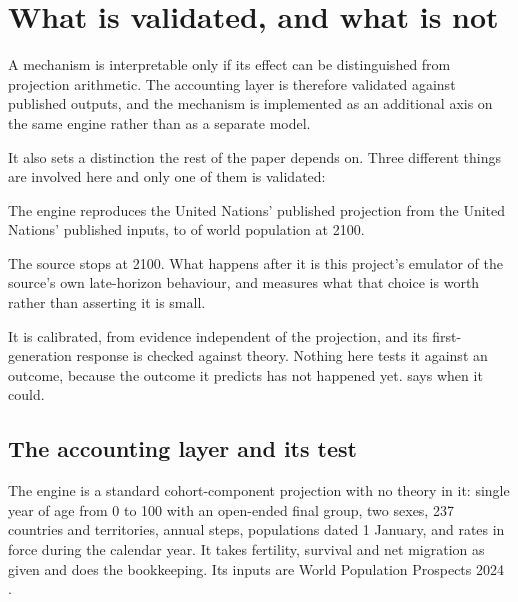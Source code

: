 \section{What is validated, and what is not}
\label{sec:engine}

A mechanism is interpretable only if its effect can be distinguished from
projection arithmetic. The accounting layer is therefore validated against
published outputs, and the mechanism is implemented as an additional axis on the
same engine rather than as a separate model.

It also sets a distinction the rest of the paper depends on. Three different
things are involved here and only one of them is validated:

\begin{description}[leftmargin=1.4em,style=nextline]
  \item[The accounting is validated.] The engine reproduces the United Nations'
  published projection from the United Nations' published inputs, to
  \ValidationWorld{} of world population at 2100.
  \item[The post-2100 continuation is ours.] The source stops at 2100. What
  happens after it is this project's emulator of the source's own late-horizon
  behaviour, and  measures what that choice is worth rather
  than asserting it is small.
  \item[The mechanism is not validated at all.] It is calibrated, from evidence
  independent of the projection, and its first-generation response is checked
  against theory. Nothing here tests it against an outcome, because the outcome
  it predicts has not happened yet.  says when it could.
\end{description}

\subsection{The accounting layer and its test}

The engine is a standard cohort-component projection with no theory in it:
single year of age from 0 to 100 with an open-ended final group, two sexes, 237
countries and territories, annual steps, populations dated 1 January, and rates
in force during the calendar year. It takes fertility, survival and net migration
as given and does the bookkeeping. Its inputs are World Population Prospects 2024
\citep{un2024methodology}.


